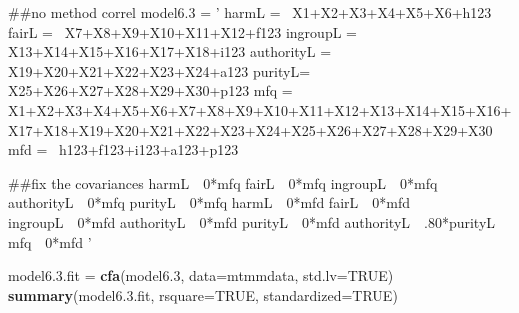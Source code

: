 \documentclass[english,man]{apa6}
\newenvironment{Shaded}{\begin{snugshade}}{\end{snugshade}}
\newcommand{\KeywordTok}[1]{\textcolor[rgb]{0.13,0.29,0.53}{\textbf{#1}}}
\newcommand{\DataTypeTok}[1]{\textcolor[rgb]{0.13,0.29,0.53}{#1}}
\newcommand{\DecValTok}[1]{\textcolor[rgb]{0.00,0.00,0.81}{#1}}
\newcommand{\FloatTok}[1]{\textcolor[rgb]{0.00,0.00,0.81}{#1}}
\newcommand{\StringTok}[1]{\textcolor[rgb]{0.31,0.60,0.02}{#1}}
\newcommand{\OtherTok}[1]{\textcolor[rgb]{0.56,0.35,0.01}{#1}}
\newcommand{\NormalTok}[1]{#1}
\newcounter{author}
\theoremstyle{definition}
\theoremstyle{definition}
\theoremstyle{definition}
\theoremstyle{remark}
\begin{document}
\begin{Shaded}
\begin{Highlighting}[]
\NormalTok{##no method correl}
\NormalTok{model6.}\DecValTok{3}\NormalTok{ =}\StringTok{ '}
\StringTok{harmL =~ X1+X2+X3+X4+X5+X6+h123}
\StringTok{fairL =~ X7+X8+X9+X10+X11+X12+f123}
\StringTok{ingroupL =~ X13+X14+X15+X16+X17+X18+i123}
\StringTok{authorityL =~ X19+X20+X21+X22+X23+X24+a123}
\StringTok{purityL=~ X25+X26+X27+X28+X29+X30+p123}
\StringTok{mfq =~ X1+X2+X3+X4+X5+X6+X7+X8+X9+X10+X11+X12+X13+X14+X15+X16+X17+X18+X19+X20+X21+X22+X23+X24+X25+X26+X27+X28+X29+X30}
\StringTok{mfd =~ h123+f123+i123+a123+p123}

\StringTok{##fix the covariances}
\StringTok{harmL~~0*mfq}
\StringTok{fairL~~0*mfq}
\StringTok{ingroupL~~0*mfq}
\StringTok{authorityL~~0*mfq}
\StringTok{purityL~~0*mfq}
\StringTok{harmL~~0*mfd}
\StringTok{fairL~~0*mfd}
\StringTok{ingroupL~~0*mfd}
\StringTok{authorityL~~0*mfd}
\StringTok{purityL~~0*mfd}
\StringTok{authorityL~~.80*purityL}
\StringTok{mfq~~0*mfd}
\StringTok{'}

\NormalTok{model6.}\FloatTok{3.}\NormalTok{fit =}\StringTok{ }\KeywordTok{cfa}\NormalTok{(model6.}\DecValTok{3}\NormalTok{, }\DataTypeTok{data=}\NormalTok{mtmmdata, }\DataTypeTok{std.lv=}\OtherTok{TRUE}\NormalTok{)}
\KeywordTok{summary}\NormalTok{(model6.}\FloatTok{3.}\NormalTok{fit, }\DataTypeTok{rsquare=}\OtherTok{TRUE}\NormalTok{, }\DataTypeTok{standardized=}\OtherTok{TRUE}\NormalTok{)}
\end{Highlighting}
\end{Shaded}
\end{document}
